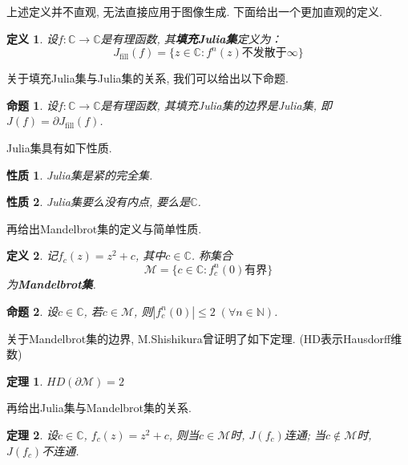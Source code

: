 \documentclass[UTF8]{ctexart}
\newtheorem{theorem}{定理}[section]  %
\newtheorem{definition}{定义}
\newtheorem{property}{性质}
\newtheorem{proposition}{命题}
\begin{document}
上述定义并不直观, 无法直接应用于图像生成. 下面给出一个更加直观的定义. 

\begin{definition}
    设$f:\mathbb{C}\to\mathbb{C}$是有理函数, 其\textbf{填充Julia集}定义为：
    \begin{equation*}
        J_{\text{fill}}(f)=\{z\in\mathbb{C}:f^n(z)\text{不发散于}\infty\}
    \end{equation*}
\end{definition}

关于填充Julia集与Julia集的关系, 我们可以给出以下命题. 

\begin{proposition}
    设$f:\mathbb{C}\to\mathbb{C}$是有理函数, 其填充Julia集的边界是Julia集, 即$J(f)=\partial J_{\text{fill}}(f)$. \cite{尹永成2002The}
\end{proposition}

Julia集具有如下性质.

\begin{property}
    Julia集是紧的完全集. \cite{2014Fractals}
\end{property}

\begin{property}
    Julia集要么没有内点, 要么是$\mathbb{C}$. \cite{2014Fractals}
\end{property}

再给出Mandelbrot集的定义与简单性质.

\begin{definition}
    记$f_c(z)=z^2+c$, 其中$c\in\mathbb{C}$. 称集合
    \begin{equation*}
        \mathcal{M}=\{c\in\mathbb{C}:f_c^{n}(0)\text{有界}\}
    \end{equation*}
    为\textbf{Mandelbrot集}.
\end{definition}

\begin{proposition}
    设$c\in\mathbb{C}$, 若$c\in\mathcal{M}$, 则$|f_c^{n}(0)|\leq 2\;(\forall n\in\mathbb{N})$. \cite{branner1989mandelbrot}
\end{proposition}

关于Mandelbrot集的边界, M.Shishikura曾证明了如下定理. (HD表示Hausdorff维数)

\begin{theorem}
    $HD(\partial \mathcal{M})=2$ \cite{Mitsuhiro1998The} 
\end{theorem}

再给出Julia集与Mandelbrot集的关系.

\begin{theorem}
    设$c\in\mathbb{C}$, $f_c(z)=z^2+c$, 则当$c\in\mathcal{M}$时, $J(f_c)$连通; 当$c\notin\mathcal{M}$时, $J(f_c)$不连通. \cite{2019ComplexAnalysis}
\end{theorem}
\end{document}
